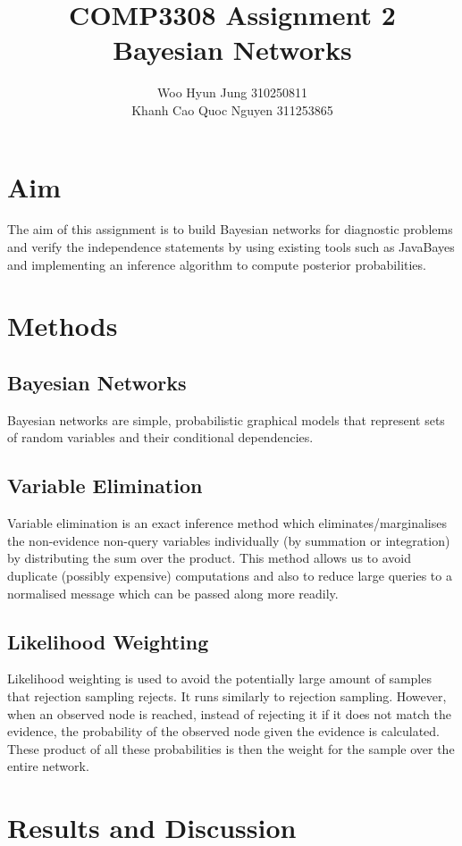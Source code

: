 \documentclass{article}
\title{COMP3308 Assignment 2 \\ Bayesian Networks}
\author{Woo Hyun Jung 310250811 \\  Khanh Cao Quoc Nguyen 311253865}
\date{}
\begin{document}
\maketitle
\thispagestyle{empty}
\newpage

\section{Aim}
The aim of this assignment is to build Bayesian networks for diagnostic problems and verify the independence statements by using existing tools such as JavaBayes and implementing an inference algorithm to compute posterior probabilities.

\section{Methods}
\subsection{Bayesian Networks}
Bayesian networks are simple, probabilistic graphical models that represent sets of random variables and their conditional dependencies.

\subsection{Variable Elimination}
Variable elimination is an exact inference method which eliminates/marginalises the non-evidence non-query variables individually (by summation or integration) by distributing the sum over the product. This method allows us to avoid duplicate (possibly expensive) computations and also to reduce large queries to a normalised message which can be passed along more readily.

\subsection{Likelihood Weighting}
Likelihood weighting is used to avoid the potentially large amount of samples that rejection sampling rejects. It runs similarly to rejection sampling. However, when an observed node is reached, instead of rejecting it if it does not match the evidence, the probability of the observed node given the evidence is calculated. These product of all these probabilities is then the weight for the sample over the entire network. 

\section{Results and Discussion}
\end{document}
